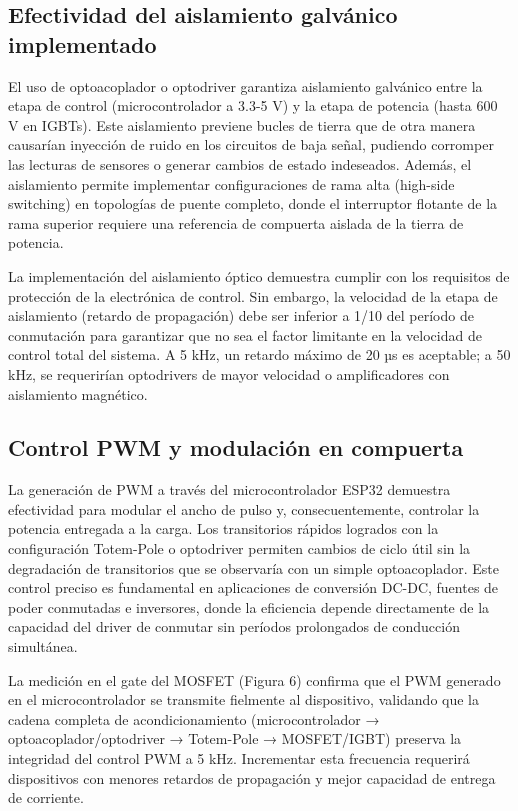 \documentclass[12pt]{article}
\begin{document}
\subsection{Efectividad del aislamiento galvánico implementado}

El uso de optoacoplador o optodriver garantiza aislamiento galvánico entre la etapa de control (microcontrolador a 3.3-5 V) y la etapa de potencia (hasta 600 V en IGBTs). Este aislamiento previene bucles de tierra que de otra manera causarían inyección de ruido en los circuitos de baja señal, pudiendo corromper las lecturas de sensores o generar cambios de estado indeseados. Además, el aislamiento permite implementar configuraciones de rama alta (high-side switching) en topologías de puente completo, donde el interruptor flotante de la rama superior requiere una referencia de compuerta aislada de la tierra de potencia.

La implementación del aislamiento óptico demuestra cumplir con los requisitos de protección de la electrónica de control. Sin embargo, la velocidad de la etapa de aislamiento (retardo de propagación) debe ser inferior a 1/10 del período de conmutación para garantizar que no sea el factor limitante en la velocidad de control total del sistema. A 5 kHz, un retardo máximo de 20 µs es aceptable; a 50 kHz, se requerirían optodrivers de mayor velocidad o amplificadores con aislamiento magnético.

\subsection{Control PWM y modulación en compuerta}

La generación de PWM a través del microcontrolador ESP32 demuestra efectividad para modular el ancho de pulso y, consecuentemente, controlar la potencia entregada a la carga. Los transitorios rápidos logrados con la configuración Totem-Pole o optodriver permiten cambios de ciclo útil sin la degradación de transitorios que se observaría con un simple optoacoplador. Este control preciso es fundamental en aplicaciones de conversión DC-DC, fuentes de poder conmutadas e inversores, donde la eficiencia depende directamente de la capacidad del driver de conmutar sin períodos prolongados de conducción simultánea.

La medición en el gate del MOSFET (Figura 6) confirma que el PWM generado en el microcontrolador se transmite fielmente al dispositivo, validando que la cadena completa de acondicionamiento (microcontrolador → optoacoplador/optodriver → Totem-Pole → MOSFET/IGBT) preserva la integridad del control PWM a 5 kHz. Incrementar esta frecuencia requerirá dispositivos con menores retardos de propagación y mejor capacidad de entrega de corriente.
\end{document}

